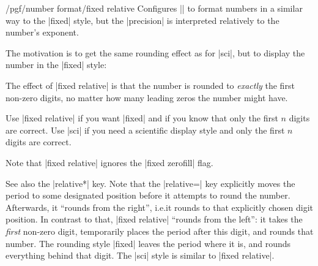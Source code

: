 \documentclass[a4paper]{ltxdoc}
\begin{document}
\begin{keylist}{/pgf/number format/fixed relative}
    Configures |\pgfmathprintnumber| to format numbers in a similar way to the
    |fixed| style, but the |precision| is interpreted relatively to the
    number's exponent.

    The motivation is to get the same rounding effect as for |sci|, but to
    display the number in the |fixed| style:
\begin{codeexample}[]
\hspace{1em}
\hspace{1em}
\hspace{1em}
\hspace{1em}
\hspace{1em}
\hspace{1em}
\hspace{1em}
\end{codeexample}

    The effect of |fixed relative| is that the number is rounded to
    \emph{exactly} the first  non-zero digits, no matter how
    many leading zeros the number might have.

    Use |fixed relative| if you want |fixed| and if you know that only the
    first $n$ digits are correct. Use |sci| if you need a scientific display
    style and only the first $n$ digits are correct.

    Note that |fixed relative| ignores the |fixed zerofill| flag.

    See also the |relative*| key. Note that the |relative=| key
    explicitly moves the period to some designated position before it attempts
    to round the number. Afterwards, it ``rounds from the right'', i.e.\@ it
    rounds to that explicitly chosen digit position. In contrast to that,
    |fixed relative| ``rounds from the left'': it takes the \emph{first}
    non-zero digit, temporarily places the period after this digit, and rounds
    that number. The rounding style |fixed| leaves the period where it is, and
    rounds everything behind that digit. The |sci| style is similar to
    |fixed relative|.
\end{keylist}
\end{document}
